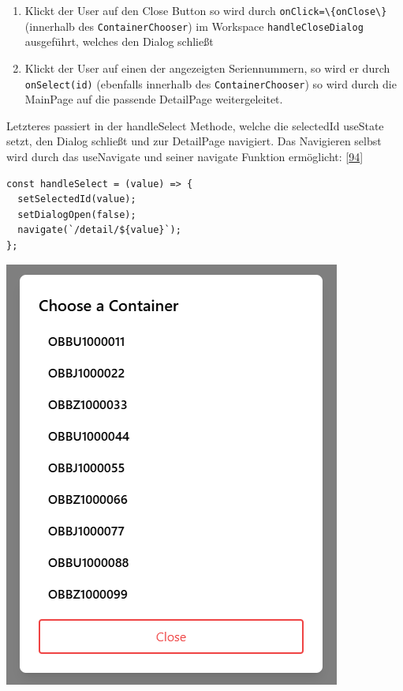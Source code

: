 \documentclass[
    headings=optiontotocandhead,%
    twoside,
    numbers=noenddot,%
    12pt, %
    titlepage, %
    parskip=full, %
    listof=leveldown, 
    numbers=noenddot, %
    a4paper,DIV=14,
    BCOR=15mm,
]{scrbook}
\newcommand{\passthrough}[1]{#1}
\let\origfigure=\figure
\let\endorigfigure=\endfigure
\renewenvironment{figure}[1][]{%
   \origfigure[H]
}{%
   \endorigfigure
}
\providecommand{\tightlist}{%
  \setlength{\itemsep}{0pt}\setlength{\parskip}{0pt}}
\begin{document}
\begin{enumerate}
\def\labelenumi{\arabic{enumi}.}
\tightlist
\item
  Klickt der User auf den Close Button so wird durch
  \passthrough{\lstinline!onClick=\{onClose\}!} (innerhalb des
  \passthrough{\lstinline!ContainerChooser!}) im Workspace
  \passthrough{\lstinline!handleCloseDialog!} ausgeführt, welches den
  Dialog schließt
\item
  Klickt der User auf einen der angezeigten Seriennummern, so wird er
  durch \passthrough{\lstinline!onSelect(id)!} (ebenfalls innerhalb des
  \passthrough{\lstinline!ContainerChooser!}) so wird durch die MainPage
  auf die passende DetailPage weitergeleitet.
\end{enumerate}

Letzteres passiert in der handleSelect Methode, welche die selectedId
useState setzt, den Dialog schließt und zur DetailPage navigiert. Das
Navigieren selbst wird durch das useNavigate und seiner navigate
Funktion ermöglicht:
{[}\protect\hyperlink{ref-GeeksForGeeks-useNavigate}{94}{]}

\begin{lstlisting}[caption={handleSelect Methode}]
const handleSelect = (value) => {
  setSelectedId(value);
  setDialogOpen(false);
  navigate(`/detail/${value}`);
};
\end{lstlisting}

\begin{figure}
\centering
\includegraphics{img/Gekle/ContainerChooserExample.png}
\caption{ContainerChooser Dialog mit 9 Containern}
\end{figure}
\end{document}

